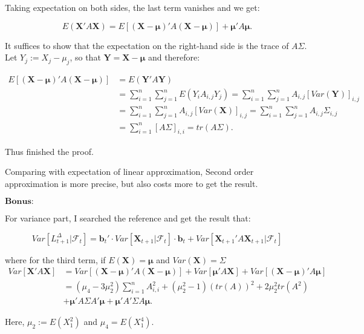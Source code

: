 \documentclass[letterpaper,11pt]{article}
\begin{document}
\begin{spacing}{1.2}
Taking expectation on both sides, the last term vanishes and we get:

$$
E(\bm{X}'A\bm{X}) = E[(\bm{X} - \bm{\mu})'A(\bm{X} - \bm{\mu})] + \bm{\mu}'A\bm{\mu}.
$$

It suffices to show that the expectation on the right-hand side is the trace of $A\Sigma$. Let $Y_j := X_j - \mu_j$, so that $\bm{Y} = \bm{X} - \bm{\mu}$ and therefore:

\begin{equation}
\begin{aligned}
E[(\bm{X} - \bm{\mu})'A(\bm{X} - \bm{\mu})] &= E(\bm{Y}'A\bm{Y}) \\
&=\sum_{i=1}^n \sum_{j=1}^n E(Y_iA_{i,j}Y_j) = \sum_{i=1}^n \sum_{j=1}^n A_{i,j}[Var(\bm{Y})]_{i,j} \\
&= \sum_{i=1}^n \sum_{j=1}^n A_{i,j}[Var(\bm{X})]_{i,j} = \sum_{i=1}^n \sum_{j=1}^n A_{i,j} \Sigma_{i,j} \\
&= \sum_{i=1}^n [A\Sigma]_{i,i} = tr(A\Sigma).
\end{aligned}
\end{equation}

Thus finished the proof.

Comparing with expectation of linear approximation, Second order approximation is more precise, but also costs more to get the result.

$\bm{Bonus:}$

For variance part, I searched the reference and get the result that:

\begin{equation}
Var[L_{t+1}^{\Delta} | \mathcal{F}_t] = \bm{b}_t' \cdot Var[\bm{X}_{t+1} | \mathcal{F}_t] \cdot \bm{b}_t + Var[\bm{X}_{t+1}'A\bm{X}_{t+1} | \mathcal{F}_t]
\end{equation}

where for the third term, if $E(\bm{X}) = \bm{\mu}$ and $Var(\bm{X}) = \Sigma$
\begin{equation}
\begin{aligned}
Var[\bm{X}'A\bm{X}] &= Var[(\bm{X} - \bm{\mu})'A(\bm{X} - \bm{\mu})] + Var[\bm{\mu}'A\bm{X}] + Var[(\bm{X} - \bm{\mu})'A\bm{\mu}] \\
&= (\mu_4 - 3\mu_2^2) \sum_{i=1}^n A_{i,i}^2 + (\mu_2^2 - 1)(tr(A))^2 + 2\mu_2^2tr(A^2) \\
&+ \bm{\mu}'A\Sigma A'\bm{\mu} + \bm{\mu}'A' \Sigma A\bm{\mu}.
\end{aligned}
\end{equation}

Here, $\mu_2 := E(X_1^2)$ and $\mu_4 = E(X_1^4)$.


\end{spacing}
\end{document}

